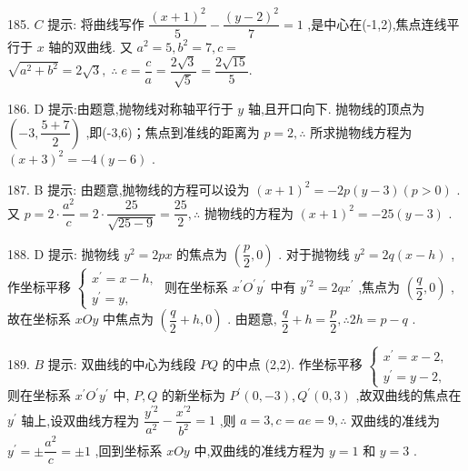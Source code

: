 185. $C$ 提示: 将曲线写作 $\dfrac{{\left( x + 1\right) }^{2}}{5} - \dfrac{{\left( y - 2\right) }^{2}}{7} = 1$ ,是中心在(-1,2),焦点连线平行于 $x$ 轴的双曲线. 又 ${a}^{2} = 5,{b}^{2} = 7,c =$  $\sqrt{{a}^{2} + {b}^{2}} = 2\sqrt{3},\;\therefore \;e = \dfrac{c}{a} = \dfrac{2\sqrt{3}}{\sqrt{5}} = \dfrac{2\sqrt{15}}{5}.$

186. D 提示:由题意,抛物线对称轴平行于 $y$ 轴,且开口向下. 抛物线的顶点为 $\left( {-3,\dfrac{5 + 7}{2}}\right)$ ,即(-3,6)；焦点到准线的距离为 $p = 2,\therefore$ 所求抛物线方程为 ${\left( x + 3\right) }^{2} =  - 4\left( {y - 6}\right)$ .

187. B 提示: 由题意,抛物线的方程可以设为 ${\left( x + 1\right) }^{2} =  - {2p}\left( {y - 3}\right) \left( {p > 0}\right)$ . 又 $p = 2 \cdot  \dfrac{{a}^{2}}{c} = 2 \cdot  \dfrac{25}{\sqrt{{25} - 9}} = \dfrac{25}{2},\therefore$ 抛物线的方程为 ${\left( x + 1\right) }^{2} =  - {25}\left( {y - 3}\right)$ .

188. D 提示: 抛物线 ${y}^{2} = {2px}$ 的焦点为 $\left( {\dfrac{p}{2},0}\right)$ . 对于抛物线 ${y}^{2} = {2q}\left( {x - h}\right)$ ,作坐标平移 $\left\{  \begin{array}{l} {x}^{\prime } = x - h, \\  {y}^{\prime } = y, \end{array}\right.$ 则在坐标系 ${x}^{\prime }{O}^{\prime }{y}^{\prime }$ 中有 ${y}^{\prime 2} = {2q}{x}^{\prime }$ ,焦点为 $\left( {\dfrac{q}{2},0}\right)$ ,故在坐标系 ${xOy}$ 中焦点为 $\left( {\dfrac{q}{2} + h,0}\right)$ . 由题意, $\dfrac{q}{2} + h = \dfrac{p}{2},\therefore {2h} = p - q$ .

189. $B$ 提示: 双曲线的中心为线段 ${PQ}$ 的中点 (2,2). 作坐标平移 $\left\{  \begin{array}{l} {x}^{\prime } = x - 2, \\  {y}^{\prime } = y - 2, \end{array}\right.$ 则在坐标系 ${x}^{\prime }{O}^{\prime }{y}^{\prime }$ 中, $P,Q$ 的新坐标为 ${P}^{\prime }\left( {0, - 3}\right) ,{Q}^{\prime }\left( {0,3}\right)$ ,故双曲线的焦点在 ${y}^{\prime }$ 轴上,设双曲线方程为 $\dfrac{{y}^{\prime 2}}{{a}^{2}} - \dfrac{{x}^{\prime 2}}{{b}^{2}} = 1$ ,则 $a = 3,c = {ae} = 9,\therefore$ 双曲线的准线为 ${y}^{\prime } =  \pm  \dfrac{{a}^{2}}{c} =  \pm  1$ ,回到坐标系 ${xOy}$ 中,双曲线的准线方程为 $y = 1$ 和 $y = 3$ .

